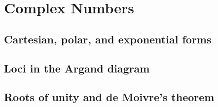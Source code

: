 
\section{Complex Numbers}

\subsection{Cartesian, polar, and exponential forms}


\subsection{Loci in the Argand diagram}


\subsection{Roots of unity and de Moivre's theorem}

